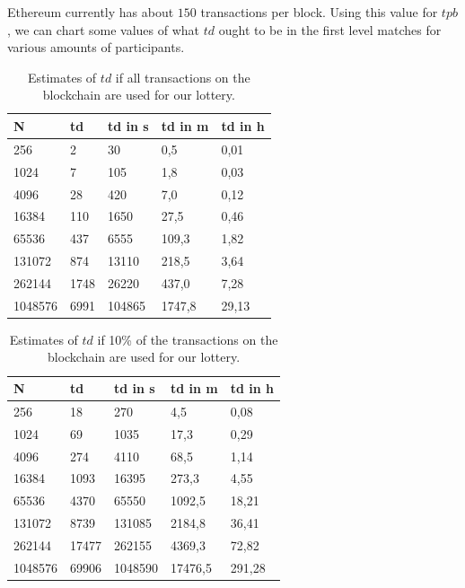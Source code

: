 Ethereum currently has about $150$ transactions per block. Using this value for $tpb$, we can chart some values of what $td$ ought to be in the first level matches for various amounts of participants.

\begin{table}[h]
\centering
\caption{Estimates of $td$ if all transactions on the blockchain are used for our lottery.}
\begin{tabular}{|l|l|l|l|l|}
\hline

N & td & td in s & td in m & td in h \\ \hline
256 & 2 & 30 & 0,5 & 0,01 \\ \hline
1024 & 7 & 105 & 1,8 & 0,03 \\ \hline
4096 & 28 & 420 & 7,0 & 0,12 \\ \hline
16384 & 110 & 1650 & 27,5 & 0,46 \\ \hline
65536 & 437 & 6555 & 109,3 & 1,82 \\ \hline
131072 & 874 & 13110 & 218,5 & 3,64 \\ \hline
262144 & 1748 & 26220 & 437,0 & 7,28 \\ \hline
1048576 & 6991 & 104865 & 1747,8 & 29,13 \\ \hline

\end{tabular}
\end{table}

\begin{table}[h]
\centering
\caption{Estimates of $td$ if 10\% of the transactions on the blockchain are used for our lottery.}
\begin{tabular}{|l|l|l|l|l|}
\hline

N & td & td in s & td in m & td in h \\ \hline
256 & 18 & 270 & 4,5 & 0,08 \\ \hline
1024 & 69 & 1035 & 17,3 & 0,29 \\ \hline
4096 & 274 & 4110 & 68,5 & 1,14 \\ \hline
16384 & 1093 & 16395 & 273,3 & 4,55 \\ \hline
65536 & 4370 & 65550 & 1092,5 & 18,21 \\ \hline
131072 & 8739 & 131085 & 2184,8 & 36,41 \\ \hline
262144 & 17477 & 262155 & 4369,3 & 72,82 \\ \hline
1048576 & 69906 & 1048590 & 17476,5 & 291,28 \\ \hline

\end{tabular}
\end{table}

